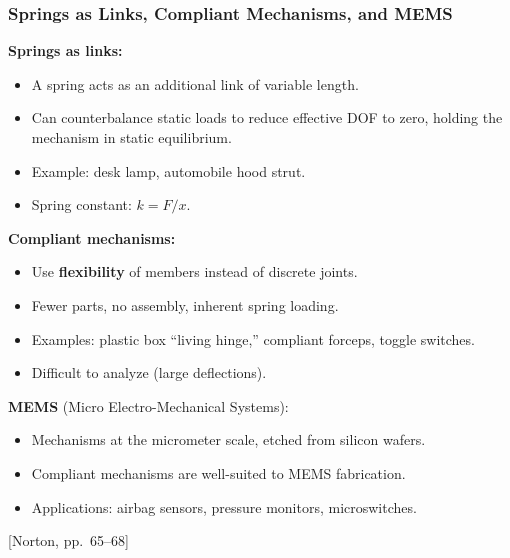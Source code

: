 \documentclass[10pt,aspectratio=43]{beamer}
\newcommand{\pref}[1]{\vfill\hfill{\scriptsize\color{gray}[Norton, pp.~#1]}}
\begin{document}

\begin{frame}
\frametitle{Springs as Links, Compliant Mechanisms, and MEMS}

\textbf{Springs as links:}
\begin{itemize}
  \item A spring acts as an additional link of variable length.
  \item Can counterbalance static loads to reduce effective DOF to zero, holding the mechanism in static equilibrium.
  \item Example: desk lamp, automobile hood strut.
  \item Spring constant: $k = F/x$.
\end{itemize}

\vspace{4pt}
\textbf{Compliant mechanisms:}
\begin{itemize}
  \item Use \textbf{flexibility} of members instead of discrete joints.
  \item Fewer parts, no assembly, inherent spring loading.
  \item Examples: plastic box ``living hinge,'' compliant forceps, toggle switches.
  \item Difficult to analyze (large deflections).
\end{itemize}

\vspace{4pt}
\textbf{MEMS} (Micro Electro-Mechanical Systems):
\begin{itemize}
  \item Mechanisms at the micrometer scale, etched from silicon wafers.
  \item Compliant mechanisms are well-suited to MEMS fabrication.
  \item Applications: airbag sensors, pressure monitors, microswitches.
\end{itemize}
\pref{65--68}
\end{frame}

\end{document}
